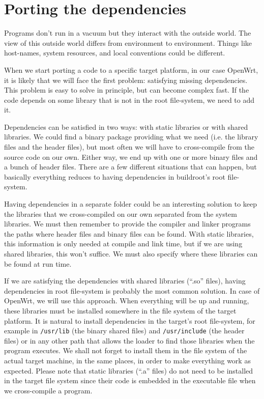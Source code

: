 \chapter{Porting the dependencies}\label{satisfy_dependencies}

Programs don’t run in a vacuum but they interact with the outside world.
The view of this outside world differs from environment to environment.
Things like host-names, system resources, and local conventions could be different.

When we start porting a code to a specific target platform, in our case OpenWrt, it is likely that we will face the first problem: satisfying missing dependencies.
This problem is easy to solve in principle, but can become complex fast.
If the code depends on some library that is not in the root file-system, we need to add it.

Dependencies can be satisfied in two ways: with static libraries or with shared libraries.
We could find a binary package providing what we need (i.e. the library files and the header files), but most often we will have to cross-compile from the source code on our own.
Either way, we end up with one or more binary files and a bunch of header files.
There are a few different situations that can happen, but basically everything reduces to having dependencies in buildroot's root file-system.

Having dependencies in a separate folder could be an interesting solution to keep the libraries that we cross-compiled on our own separated from the system libraries.
We must then remember to provide the compiler and linker programs the paths where header files and binary files can be found.
With static libraries, this information is only needed at compile and link time, but if we are using shared libraries, this won’t suffice.
We must also specify where these libraries can be found at run time.

If we are satisfying the dependencies with shared libraries (“.so” files), having dependencies in root file-system is probably the most common solution.
In case of OpenWrt, we will use this approach.
When everything will be up and running, these libraries must be installed somewhere in the file system of the target platform.
It is natural to install dependencies in the target's root file-system, for example in {\tt /usr/lib} (the binary shared files) and {\tt /usr/include} (the header files) or in any other path that allows the loader to find those libraries when the program executes.
We shall not forget to install them in the file system of the actual target machine, in the same places, in order to make everything work as expected.
Please note that static libraries (“.a” files) do not need to be installed in the target file system since their code is embedded in the executable file when we cross-compile a program\cite{fabrizio}.



